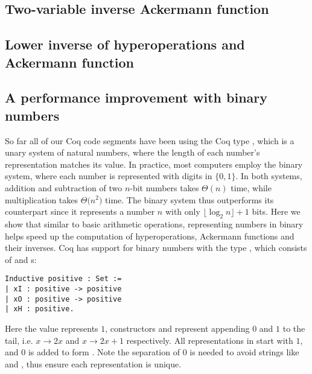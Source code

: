 \newcommand{\Texp}{\runtime_{\li{exp}}}
\newcommand{\Tmul}{\runtime_{\li{mul}}}
\newcommand{\Tleb}{\runtime_{\li{leb}}}
\newcommand{\Tsucc}{\runtime_{\li{succ}}}
\subsection{Two-variable inverse Ackermann function}
\subsection{Lower inverse of hyperoperations and Ackermann function}
\subsection{A performance improvement with binary numbers}
So far all of our Coq code segments have been using the Coq type , which is a unary system of natural numbers, where the length of each number's representation matches its value. In practice, most computers employ the binary system, where each number is represented with digits in $\{0, 1\}$. In both systems, addition and subtraction of two $n$-bit numbers takes $\Theta(n)$ time, while multiplication takes $\Theta \big(n^2\big)$ time. The binary system thus outperforms its counterpart since it represents a number $n$ with only $\lfloor \log_2n \rfloor + 1$ bits. Here we show that similar to basic arithmetic operations, representing numbers in binary helps speed up the computation of hyperoperations, Ackermann functions and their inverses. Coq has support for binary numbers with the type , which consists of  and s:
\begin{lstlisting}
Inductive positive : Set :=
| xI : positive -> positive
| xO : positive -> positive
| xH : positive.
\end{lstlisting} 
Here the value  represents $1$, constructors  and  represent appending $0$ and $1$ to the tail, i.e. $x\to 2x$ and $x\to 2x+1$ respectively. All representations in  start with $1$, and $0$ is added to form . Note the separation of $0$ is needed to avoid strings like  and , thus ensure each representation is unique.

